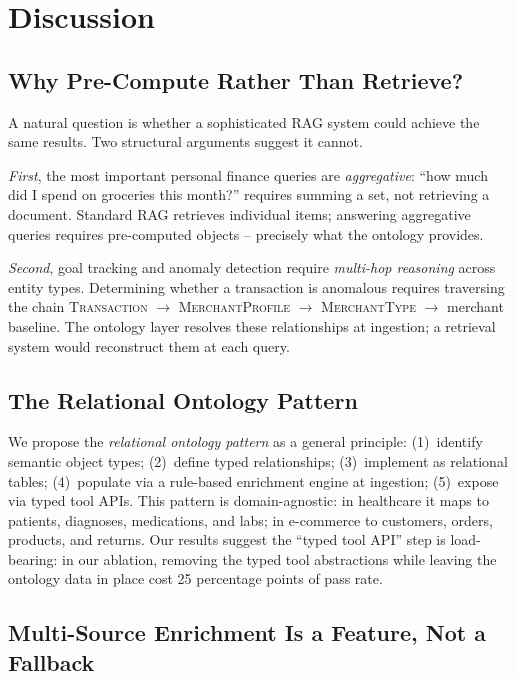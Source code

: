 \documentclass[conference]{IEEEtran}
\begin{document}
\section{Discussion}

\subsection{Why Pre-Compute Rather Than Retrieve?}

A natural question is whether a sophisticated RAG system could
achieve the same results. Two structural arguments suggest it
cannot.

\emph{First}, the most important personal finance queries are
\emph{aggregative}: ``how much did I spend on groceries this
month?'' requires summing a set, not retrieving a document.
Standard RAG retrieves individual items; answering aggregative
queries requires pre-computed objects -- precisely what the
ontology provides.

\emph{Second}, goal tracking and anomaly detection require
\emph{multi-hop reasoning} across entity types. Determining whether
a transaction is anomalous requires traversing the chain
\textsc{Transaction} $\rightarrow$ \textsc{MerchantProfile}
$\rightarrow$ \textsc{MerchantType} $\rightarrow$ merchant
baseline. The ontology layer resolves these relationships at
ingestion; a retrieval system would reconstruct them at each query.

\subsection{The Relational Ontology Pattern}

We propose the \emph{relational ontology pattern} as a general
principle: (1)~identify semantic object types;
(2)~define typed relationships;
(3)~implement as relational tables;
(4)~populate via a rule-based enrichment engine at ingestion;
(5)~expose via typed tool APIs.
This pattern is domain-agnostic: in healthcare it maps to patients,
diagnoses, medications, and labs; in e-commerce to customers,
orders, products, and returns. Our results suggest the ``typed
tool API'' step is load-bearing: in our ablation, removing the
typed tool abstractions while leaving the ontology data in place
cost 25 percentage points of pass rate.

\subsection{Multi-Source Enrichment Is a Feature, Not a Fallback}
\end{document}
